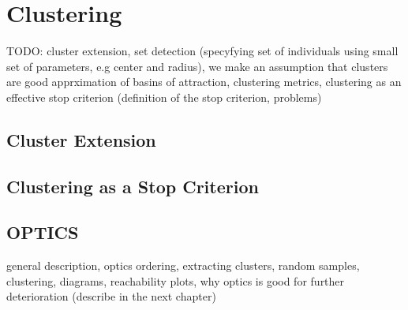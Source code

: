 
\chapter{Clustering}
\label{Clustering}

TODO: cluster extension, set detection (specyfying set of individuals using
small set of parameters, e.g center and radius),
we make an assumption that clusters are good apprximation of basins of
attraction,
clustering metrics,
clustering as an effective stop criterion (definition of the stop criterion,
problems)


\section{Cluster Extension}

\section{Clustering as a Stop Criterion}

\section{OPTICS}
general description, optics ordering, extracting clusters, random samples,
clustering, diagrams, reachability plots,
why optics is good for further deterioration (describe in the next chapter)